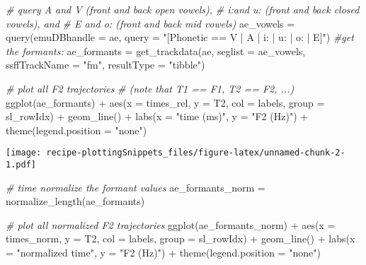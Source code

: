 \documentclass[
]{book}
\newenvironment{Shaded}{\begin{snugshade}}{\end{snugshade}}
\newcommand{\AttributeTok}[1]{\textcolor[rgb]{0.77,0.63,0.00}{#1}}
\newcommand{\CommentTok}[1]{\textcolor[rgb]{0.56,0.35,0.01}{\textit{#1}}}
\newcommand{\FunctionTok}[1]{\textcolor[rgb]{0.00,0.00,0.00}{#1}}
\newcommand{\NormalTok}[1]{#1}
\newcommand{\OtherTok}[1]{\textcolor[rgb]{0.56,0.35,0.01}{#1}}
\newcommand{\SpecialCharTok}[1]{\textcolor[rgb]{0.00,0.00,0.00}{#1}}
\newcommand{\StringTok}[1]{\textcolor[rgb]{0.31,0.60,0.02}{#1}}
\begin{document}
\begin{Shaded}
\begin{Highlighting}[]
\CommentTok{\# query A and V (front and back open vowels),}
\CommentTok{\# i:and u: (front and back closed vowels), and}
\CommentTok{\# E and o: (front and back mid vowels)}
\NormalTok{ae\_vowels }\OtherTok{=} \FunctionTok{query}\NormalTok{(}\AttributeTok{emuDBhandle =}\NormalTok{ ae,}
                  \AttributeTok{query =} \StringTok{"[Phonetic == V | A | i: | u: | o: | E]"}\NormalTok{)}
\CommentTok{\#get the formants:}
\NormalTok{ae\_formants }\OtherTok{=} \FunctionTok{get\_trackdata}\NormalTok{(ae, }
                            \AttributeTok{seglist =}\NormalTok{ ae\_vowels,}
                            \AttributeTok{ssffTrackName =} \StringTok{"fm"}\NormalTok{,}
                            \AttributeTok{resultType =} \StringTok{"tibble"}\NormalTok{)}

\CommentTok{\# plot all F2 trajectories}
\CommentTok{\# (note that T1 == F1, T2 == F2, ...)}
\FunctionTok{ggplot}\NormalTok{(ae\_formants) }\SpecialCharTok{+}
  \FunctionTok{aes}\NormalTok{(}\AttributeTok{x =}\NormalTok{ times\_rel, }\AttributeTok{y =}\NormalTok{ T2, }\AttributeTok{col =}\NormalTok{ labels, }\AttributeTok{group =}\NormalTok{ sl\_rowIdx) }\SpecialCharTok{+}
  \FunctionTok{geom\_line}\NormalTok{() }\SpecialCharTok{+}
  \FunctionTok{labs}\NormalTok{(}\AttributeTok{x =} \StringTok{"time (ms)"}\NormalTok{, }\AttributeTok{y =} \StringTok{"F2 (Hz)"}\NormalTok{) }\SpecialCharTok{+}
  \FunctionTok{theme}\NormalTok{(}\AttributeTok{legend.position =} \StringTok{"none"}\NormalTok{)}
\end{Highlighting}
\end{Shaded}

\texttt{[image: recipe-plottingSnippets\_files/figure-latex/unnamed-chunk-2-1.pdf]}

\begin{Shaded}
\begin{Highlighting}[]
\CommentTok{\# time normalize the formant values}
\NormalTok{ae\_formants\_norm }\OtherTok{=} \FunctionTok{normalize\_length}\NormalTok{(ae\_formants)}

\CommentTok{\# plot all normalized F2 trajectories}
\FunctionTok{ggplot}\NormalTok{(ae\_formants\_norm) }\SpecialCharTok{+}
  \FunctionTok{aes}\NormalTok{(}\AttributeTok{x =}\NormalTok{ times\_norm, }\AttributeTok{y =}\NormalTok{ T2, }\AttributeTok{col =}\NormalTok{ labels, }\AttributeTok{group =}\NormalTok{ sl\_rowIdx) }\SpecialCharTok{+}
  \FunctionTok{geom\_line}\NormalTok{() }\SpecialCharTok{+}
  \FunctionTok{labs}\NormalTok{(}\AttributeTok{x =} \StringTok{"normalized time"}\NormalTok{, }\AttributeTok{y =} \StringTok{"F2 (Hz)"}\NormalTok{) }\SpecialCharTok{+}
  \FunctionTok{theme}\NormalTok{(}\AttributeTok{legend.position =} \StringTok{"none"}\NormalTok{)}
\end{Highlighting}
\end{Shaded}
\end{document}
